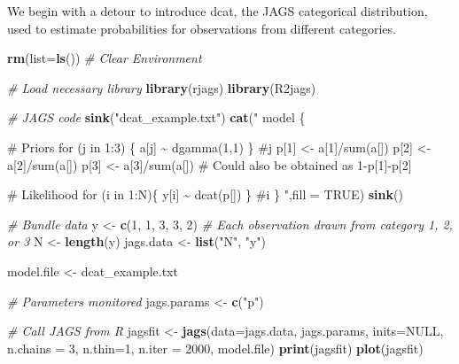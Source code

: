 \documentclass[
]{krantz}
\makeatletter
\newenvironment{Shaded}{\begin{snugshade}}{\end{snugshade}}
\newcommand{\AttributeTok}[1]{\textcolor[rgb]{0.27,0.27,0.27}{#1}}
\newcommand{\CommentTok}[1]{\textcolor[rgb]{0.37,0.37,0.37}{\textit{#1}}}
\newcommand{\ConstantTok}[1]{\textcolor[rgb]{0.37,0.37,0.37}{#1}}
\newcommand{\DecValTok}[1]{\textcolor[rgb]{0.06,0.06,0.06}{#1}}
\newcommand{\FunctionTok}[1]{\textcolor[rgb]{0.27,0.27,0.27}{\textbf{#1}}}
\newcommand{\NormalTok}[1]{#1}
\newcommand{\OtherTok}[1]{\textcolor[rgb]{0.37,0.37,0.37}{#1}}
\newcommand{\StringTok}[1]{\textcolor[rgb]{0.5,0.5,0.5}{#1}}
\newenvironment{kframe}{%
\medskip{}
\setlength{\fboxsep}{.8em}
 \def\at@end@of@kframe{}%
 \ifinner\ifhmode%
  \def\at@end@of@kframe{\end{minipage}}%
  \begin{minipage}{\columnwidth}%
 \fi\fi%
 \def\FrameCommand##1{\hskip\@totalleftmargin \hskip-\fboxsep
 \colorbox{shadecolor}{##1}\hskip-\fboxsep
     \hskip-\linewidth \hskip-\@totalleftmargin \hskip\columnwidth}%
 \MakeFramed {\advance\hsize-\width
   \@totalleftmargin\z@ \linewidth\hsize
   \@setminipage}}%
 {\par\unskip\endMakeFramed%
 \at@end@of@kframe}
\renewenvironment{Shaded}{\begin{kframe}}{\end{kframe}}
\makeatother
\begin{document}
We begin with a detour to introduce dcat, the JAGS categorical distribution, used to estimate probabilities for observations from different categories.

\begin{Shaded}
\begin{Highlighting}[]
\FunctionTok{rm}\NormalTok{(}\AttributeTok{list=}\FunctionTok{ls}\NormalTok{()) }\CommentTok{\# Clear Environment}

\CommentTok{\# Load necessary library}
\FunctionTok{library}\NormalTok{(rjags)}
\FunctionTok{library}\NormalTok{(R2jags)}

\CommentTok{\# JAGS code}
\FunctionTok{sink}\NormalTok{(}\StringTok{"dcat\_example.txt"}\NormalTok{)}
\FunctionTok{cat}\NormalTok{(}\StringTok{"}
\StringTok{model \{}

\StringTok{\# Priors}
\StringTok{    for (j in 1:3) \{}
\StringTok{         a[j] \textasciitilde{} dgamma(1,1)}
\StringTok{         \} \#j}
\StringTok{     p[1] \textless{}{-} a[1]/sum(a[])}
\StringTok{     p[2] \textless{}{-} a[2]/sum(a[])}
\StringTok{     p[3] \textless{}{-} a[3]/sum(a[]) \# Could also be obtained as 1{-}p[1]{-}p[2]}

\StringTok{\# Likelihood}
\StringTok{  for (i in 1:N)\{}
\StringTok{    y[i] \textasciitilde{} dcat(p[])}
\StringTok{  \} \#i}
\StringTok{\}}
\StringTok{    "}\NormalTok{,}\AttributeTok{fill =} \ConstantTok{TRUE}\NormalTok{)}
\FunctionTok{sink}\NormalTok{()}

\CommentTok{\# Bundle data}
\NormalTok{y }\OtherTok{\textless{}{-}} \FunctionTok{c}\NormalTok{(}\DecValTok{1}\NormalTok{, }\DecValTok{1}\NormalTok{, }\DecValTok{3}\NormalTok{, }\DecValTok{3}\NormalTok{, }\DecValTok{2}\NormalTok{) }\CommentTok{\# Each observation drawn from category 1, 2, or 3}
\NormalTok{N }\OtherTok{\textless{}{-}} \FunctionTok{length}\NormalTok{(y)}
\NormalTok{jags.data }\OtherTok{\textless{}{-}} \FunctionTok{list}\NormalTok{(}\StringTok{"N"}\NormalTok{, }\StringTok{"y"}\NormalTok{)}

\NormalTok{model.file }\OtherTok{\textless{}{-}} \StringTok{\textquotesingle{}dcat\_example.txt\textquotesingle{}}

\CommentTok{\# Parameters monitored}
\NormalTok{jags.params }\OtherTok{\textless{}{-}} \FunctionTok{c}\NormalTok{(}\StringTok{"p"}\NormalTok{)}

\CommentTok{\# Call JAGS from R}
\NormalTok{jagsfit }\OtherTok{\textless{}{-}} \FunctionTok{jags}\NormalTok{(}\AttributeTok{data=}\NormalTok{jags.data, jags.params, }\AttributeTok{inits=}\ConstantTok{NULL}\NormalTok{,}
                \AttributeTok{n.chains =} \DecValTok{3}\NormalTok{, }\AttributeTok{n.thin=}\DecValTok{1}\NormalTok{, }\AttributeTok{n.iter =} \DecValTok{2000}\NormalTok{,}
\NormalTok{                model.file)}
\FunctionTok{print}\NormalTok{(jagsfit)}
\FunctionTok{plot}\NormalTok{(jagsfit)}
\end{Highlighting}
\end{Shaded}
\end{document}
